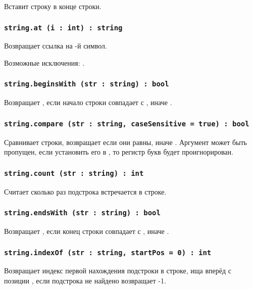 Вставит строку  в конце строки.

\subsubsection{\lstinline|string.at (i : int) : string|}

Возвращает ссылка на -й символ.

Возможные исключения: .

\subsubsection{\lstinline|string.beginsWith (str : string) : bool|}

Возвращает \true{}, если начало строки совпадает с , иначе \false{}.

\subsubsection{\lstinline|string.compare (str : string, caseSensitive = true) : bool|}

Сравнивает строки, возвращает \true{} если они равны, иначе \false{}. Аргумент  может быть пропущен, если установить его в \false{}, то регистр букв будет проигнорирован.

\subsubsection{\lstinline|string.count (str : string) : int|}

Считает сколько раз подстрока  встречается в строке.

\subsubsection{\lstinline|string.endsWith (str : string) : bool|}

Возвращает \true{}, если конец строки совпадает с , иначе \false{}.

\subsubsection{\lstinline|string.indexOf (str : string, startPos = 0) : int|}

Возвращает индекс первой нахождения подстроки  в строке, ища вперёд с позиции , если подстрока не найдено возвращает -1.

